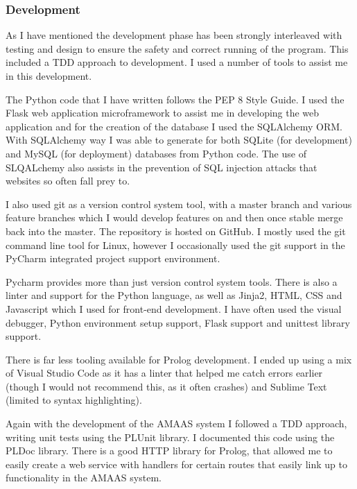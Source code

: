 \documentclass[]{final_report}
\begin{document}
\subsubsection{Development}
As I have mentioned the development phase has been strongly interleaved with testing and design to ensure the safety and correct running of the program. This included a TDD approach to development. I used a number of tools to assist me in this development.\par 
The Python code that I have written follows the PEP 8 Style Guide. I used the Flask web application microframework to assist me in developing the web application and for the creation of the database I used the SQLAlchemy ORM. With SQLAlchemy way I was able to generate for both SQLite (for development) and MySQL (for deployment) databases from Python code. The use of SLQALchemy also assists in the prevention of SQL injection attacks that websites so often fall prey to.\par 
I also used git as a version control system tool, with a master branch and various feature branches which I would develop features on and then once stable merge back into the master. The repository is hosted on GitHub. I mostly used the git command line tool for Linux, however I occasionally used the git support in the PyCharm integrated project support environment.\par 
Pycharm provides more than just version control system tools. There is also a linter and support for the Python language, as well as Jinja2, HTML, CSS and Javascript which I used for front-end development. I have often used the visual debugger, Python environment setup support, Flask support and unittest library support.\par 
There is far less tooling available for Prolog development. I ended up using a mix of Visual Studio Code as it has a linter that helped me catch errors earlier (though I would not recommend this, as it often crashes) and Sublime Text (limited to syntax highlighting).\par 
Again with the development of the AMAAS system I followed a TDD approach, writing unit tests using the PLUnit library. I documented this code using the PLDoc library. There is a good HTTP library for Prolog, that allowed me to easily create a web service with handlers for certain routes that easily link up to functionality in the AMAAS system.
\end{document}
